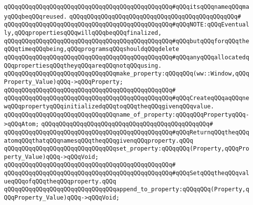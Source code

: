 \verb|qQQqqQQqqQQqqQQqqQQqqQQqqQQqqQQqqQQqqQQqqQQqqQQq#qQQqitsqQQqnameqQQqmayqQQqbeqQQqreused.|\newline
\verb|qQQqqQQqqQQqqQQqqQQqqQQqqQQqqQQqqQQqqQQqqQQqqQQq#|\newline
\verb|qQQqqQQqqQQqqQQqqQQqqQQqqQQqqQQqqQQqqQQqqQQqqQQq#qQQqNOTE:qQQqEventually,qQQqpropertiesqQQqwillqQQqbeqQQqfinalized,|\newline
\verb|qQQqqQQqqQQqqQQqqQQqqQQqqQQqqQQqqQQqqQQqqQQqqQQq#qQQqbutqQQqforqQQqtheqQQqtimeqQQqbeing,qQQqprogramsqQQqshouldqQQqdelete|\newline
\verb|qQQqqQQqqQQqqQQqqQQqqQQqqQQqqQQqqQQqqQQqqQQqqQQq#qQQqanyqQQqallocatedqQQqpropertiesqQQqtheyqQQqareqQQqnotqQQqusing.|\newline
\newline
\newline
\verb|qQQqqQQqqQQqqQQqqQQqqQQqqQQqqQQqmake_property:qQQqqQQq(ww::Window,qQQqProperty_Value)qQQq->qQQqProperty;|\newline
\verb|qQQqqQQqqQQqqQQqqQQqqQQqqQQqqQQqqQQqqQQqqQQqqQQq#|\newline
\verb|qQQqqQQqqQQqqQQqqQQqqQQqqQQqqQQqqQQqqQQqqQQqqQQq#qQQqCreateqQQqaqQQqnewqQQqpropertyqQQqinitializedqQQqtoqQQqtheqQQqgivenqQQqvalue.|\newline
\newline
\newline
\newline
\verb|qQQqqQQqqQQqqQQqqQQqqQQqqQQqqQQqname_of_property:qQQqqQQqPropertyqQQq->qQQqAtom;|\newline
\verb|qQQqqQQqqQQqqQQqqQQqqQQqqQQqqQQqqQQqqQQqqQQqqQQq#|\newline
\verb|qQQqqQQqqQQqqQQqqQQqqQQqqQQqqQQqqQQqqQQqqQQqqQQq#qQQqReturnqQQqtheqQQqatomqQQqthatqQQqnamesqQQqtheqQQqgivenqQQqproperty.qQQq|\newline
\newline
\newline
\newline
\verb|qQQqqQQqqQQqqQQqqQQqqQQqqQQqqQQqset_property:qQQqqQQq(Property,qQQqProperty_Value)qQQq->qQQqVoid;|\newline
\verb|qQQqqQQqqQQqqQQqqQQqqQQqqQQqqQQqqQQqqQQqqQQqqQQq#|\newline
\verb|qQQqqQQqqQQqqQQqqQQqqQQqqQQqqQQqqQQqqQQqqQQqqQQq#qQQqSetqQQqtheqQQqvalueqQQqofqQQqtheqQQqproperty.qQQq|\newline
\newline
\newline
\verb|qQQqqQQqqQQqqQQqqQQqqQQqqQQqqQQqappend_to_property:qQQqqQQq(Property,qQQqProperty_Value)qQQq->qQQqVoid;|\newline
